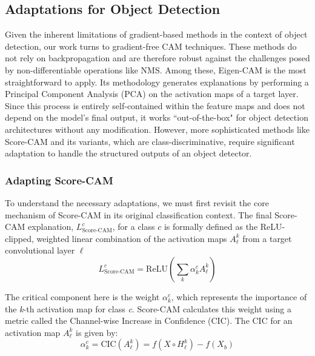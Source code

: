 \subsection{Adaptations for Object Detection}
Given the inherent limitations of gradient-based methods in the context of object detection, our work turns to gradient-free CAM techniques. These methods do not rely on backpropagation and are therefore robust against the challenges posed by non-differentiable operations like NMS.
Among these, Eigen-CAM is the most straightforward to apply. Its methodology generates explanations by performing a Principal Component Analysis (PCA) on the activation maps of a target layer. Since this process is entirely self-contained within the feature maps and does not depend on the model's final output, it works ``out-of-the-box" for object detection architectures without any modification.
However, more sophisticated methods like Score-CAM and its variants, which are class-discriminative, require significant adaptation to handle the structured outputs of an object detector.

\subsubsection{Adapting Score-CAM}

To understand the necessary adaptations, we must first revisit the core mechanism of Score-CAM in its original classification context. The final Score-CAM explanation, $L^{c}_{\text{Score-CAM}}$, for a class $c$ is formally defined as the ReLU-clipped, weighted linear combination of the activation maps $A^{k}_{\ell}$ from a target convolutional layer $\ell$
\begin{equation}
    L^{c}_{\text{Score-CAM}} = \mathrm{ReLU}\left( \sum_{k} \alpha^{c}_{k} A^{k}_{\ell} \right)
    \label{eq:scorecam}
\end{equation}

The critical component here is the weight $\alpha^{c}_{k}$, which represents the importance of the \textit{k}-th activation map for class \textit{c}. Score-CAM calculates this weight using a metric called the Channel-wise Increase in Confidence (CIC). The CIC for an activation map $A^{k}_{\ell}$ is given by:
\begin{equation}
    \alpha_k^c = \text{CIC}\left(A^{k}_{\ell}\right) = f\left(X \circ H^{k}_{\ell}\right) - f(X_{b})
    \label{eq:cic}
\end{equation}

